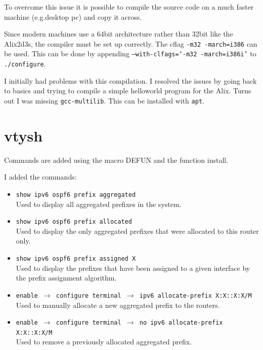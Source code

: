 To overcome this issue it is possible to compile the source code on a much
faster machine (e.g.\@ desktop pc) and copy it across. 

Since modern machines use a 64bit architecture rather than 32bit like the
Alix2d3s, the compiler must be set up correctly. The cflag \texttt{-m32
-march=i386} can be used. This can be done by appending
\texttt{--with-clfags=`-m32 -march=i386i'} to \texttt{\@./configure}.

I initially had problems with this compilation. I resolved the issues by going
back to basics and trying to compile a simple helloworld program for the Alix.
Turns out I was missing \texttt{gcc-multilib}. This can be installed with \texttt{apt}.

\chapter{vtysh}
\label{vtysh}
Commands are added using the macro DEFUN and the function install.

I added the commands:
\begin{itemize}
	\item \texttt{show ipv6 ospf6 prefix aggregated} \\
		Used to display all aggregated prefixes in the system.
	\item \texttt{show ipv6 ospf6 prefix allocated} \\ 
		Used to display the only aggregated prefixes that were allocated to this
		router only.
	\item \texttt{show ipv6 ospf6 prefix assigned X} \\
		Used to display the prefixes that have been assigned to a given interface
		by the prefix assignment algorithm. 


	\item \texttt{enable $\rightarrow$ configure terminal 
		$\rightarrow$ ipv6 allocate-prefix X:X::X:X/M} \\
		Used to manually allocate a new aggregated prefix to the routers.
	\item \texttt{enable $\rightarrow$ configure terminal
		$\rightarrow$ no ipv6 allocate-prefix X:X::X:X/M} \\
		Used to remove a previously allocated aggregated prefix.
\end{itemize}
